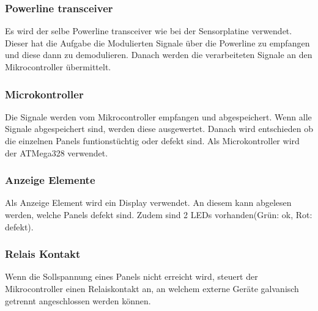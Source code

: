 \subsubsection{Powerline transceiver}
Es wird der selbe Powerline transceiver wie bei der Sensorplatine verwendet. Dieser hat die Aufgabe die Modulierten Signale über die Powerline zu empfangen und diese dann zu demodulieren. Danach werden die verarbeiteten Signale an den Mikrocontroller übermittelt.

\subsubsection{Microkontroller}
Die Signale werden vom Mikrocontroller empfangen und abgespeichert. Wenn alle Signale abgespeichert sind, werden diese ausgewertet. Danach wird entschieden ob die einzelnen Panels funtionstüchtig oder defekt sind. Als Microkontroller wird der ATMega328 verwendet.

\subsubsection{Anzeige Elemente}
Als Anzeige Element wird ein Display verwendet. An diesem kann abgelesen werden, welche Panels defekt sind. Zudem sind 2 LEDs vorhanden(Grün: ok, Rot: defekt).

\subsubsection{Relais Kontakt}
Wenn die Sollspannung eines Panels nicht erreicht wird, steuert der Mikrocontroller einen Relaiskontakt an, an welchem externe Geräte galvanisch getrennt angeschlossen werden können.

%
